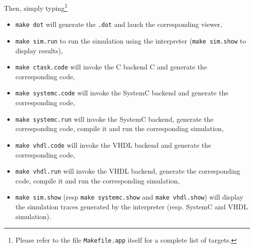 Then, simply typing\footnote{Please refer to the file \texttt{Makefile.app} itself for
  a complete list of targets.}
  \begin{itemize}
  \item \verb|make dot| will generate the \verb|.dot| and lauch the corresponding viewer,
  \item \verb|make sim.run| to run the simulation using the interpreter (\verb|make sim.show| to display results),
  \item \verb|make ctask.code| will invoke the C backend C and generate the corresponding code,
  \item \verb|make systemc.code| will invoke the SystemC backend  and generate the corresponding code,
  \item \verb|make systemc.run| will invoke the SystemC backend, generate the corresponding
    code, compile it and run the corresponding simulation,
  \item \verb|make vhdl.code| will invoke the VHDL backend  and generate the corresponding code,
  \item \verb|make vhdl.run| will invoke the VHDL backend, generate the corresponding
    code, compile it and run the corresponding simulation,
  \item \verb|make sim.show| (resp \verb|make systemc.show| and \verb|make vhdl.show|) will display
    the simulation traces generated by the interpreter (resp. SystemC and VHDL simulation).
  \end{itemize}


